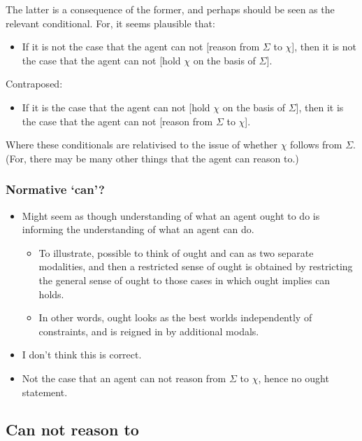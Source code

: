 \documentclass[10pt]{article}
\begin{document}
The latter is a consequence of the former, and perhaps should be seen as the relevant conditional.
For, it seems plausible that:

\begin{itemize}
\item If it is not the case that the agent can not [reason from \(\Sigma\) to \(\chi\)], then it is not the case that the agent can not [hold \(\chi\) on the basis of \(\Sigma\)].
\end{itemize}

Contraposed:

\begin{itemize}
\item If it is the case that the agent can not [hold \(\chi\) on the basis of \(\Sigma\)], then it is the case that the agent can not [reason from \(\Sigma\) to \(\chi\)].
\end{itemize}

Where these conditionals are relativised to the issue of whether \(\chi\) follows from \(\Sigma\).
(For, there may be many other things that the agent can reason to.)

\subsubsection{Normative `can'?}
\label{sec:normative-can}

\begin{itemize}
\item Might seem as though understanding of what an agent ought to do is informing the understanding of what an agent can do.
  \begin{itemize}
  \item To illustrate, possible to think of ought and can as two separate modalities, and then a restricted sense of ought is obtained by restricting the general sense of ought to those cases in which ought implies can holds.
  \item In other words, ought looks as the best worlds independently of constraints, and is reigned in by additional modals.
  \end{itemize}
\item I don't think this is correct.
\item Not the case that an agent can not reason from \(\Sigma\) to \(\chi\), hence no ought statement.
\end{itemize}

\subsection{Can not reason to}
\label{sec:can-not-reason}
\end{document}
